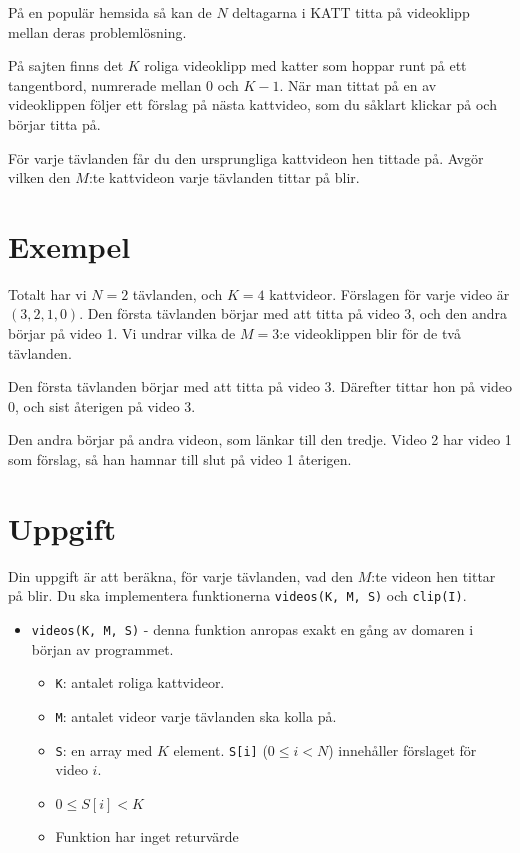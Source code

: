 \newcommand\version{v2}
På en populär hemsida så kan de $N$ deltagarna i KATT titta på videoklipp mellan deras problemlösning.

På sajten finns det $K$ roliga videoklipp med katter som hoppar runt på ett tangentbord, numrerade mellan $0$ och $K - 1$.
När man tittat på en av videoklippen följer ett förslag på nästa kattvideo, som du såklart klickar på och börjar titta på.

För varje tävlanden får du den ursprungliga kattvideon hen tittade på. Avgör vilken den $M$:te kattvideon varje tävlanden tittar på blir.

\section*{Exempel}
Totalt har vi $N = 2$ tävlanden, och $K = 4$ kattvideor.
Förslagen för varje video är $(3, 2, 1, 0)$. Den första tävlanden börjar med att titta på video 3, och den andra börjar på video 1.
Vi undrar vilka de $M = 3$:e videoklippen blir för de två tävlanden.

Den första tävlanden börjar med att titta på video 3. Därefter tittar hon på video 0, och sist återigen på video 3.

Den andra börjar på andra videon, som länkar till den tredje. Video 2 har video 1 som förslag, så han hamnar till slut på video 1 återigen.

\section*{Uppgift}
Din uppgift är att beräkna, för varje tävlanden, vad den $M$:te videon hen tittar på blir.
Du ska implementera funktionerna \texttt{videos(K, M, S)} och \texttt{clip(I)}.

\begin{itemize}
  \item \texttt{videos(K, M, S)} - denna funktion anropas exakt en gång av domaren i början av programmet.
  \begin{itemize}
    \item \texttt{K}: antalet roliga kattvideor.
    \item \texttt{M}: antalet videor varje tävlanden ska kolla på.
    \item \texttt{S}: en array med $K$ element. \texttt{S[i]} ($0 \le i < N$) innehåller förslaget för video $i$.
		\item $0 \le S[i] < K$
    \item Funktion har inget returvärde
  \end{itemize}
\end{itemize}

